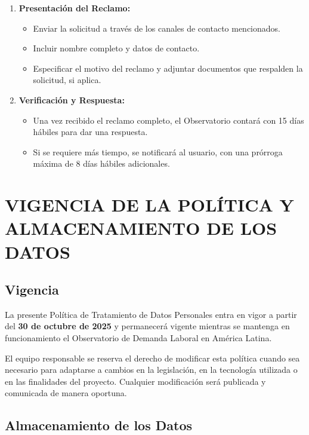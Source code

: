 \documentclass[11pt,oneside,letterpaper]{article}
\begin{document}
\begin{enumerate}
    \item \textbf{Presentación del Reclamo:}
    \begin{itemize}
        \item Enviar la solicitud a través de los canales de contacto mencionados.
        \item Incluir nombre completo y datos de contacto.
        \item Especificar el motivo del reclamo y adjuntar documentos que respalden la solicitud, si aplica.
    \end{itemize}

    \item \textbf{Verificación y Respuesta:}
    \begin{itemize}
        \item Una vez recibido el reclamo completo, el Observatorio contará con 15 días hábiles para dar una respuesta.
        \item Si se requiere más tiempo, se notificará al usuario, con una prórroga máxima de 8 días hábiles adicionales.
    \end{itemize}
\end{enumerate}

\newpage

\section{VIGENCIA DE LA POLÍTICA Y ALMACENAMIENTO DE LOS DATOS}

\subsection{Vigencia}

La presente Política de Tratamiento de Datos Personales entra en vigor a partir del \textbf{30 de octubre de 2025} y permanecerá vigente mientras se mantenga en funcionamiento el Observatorio de Demanda Laboral en América Latina.

El equipo responsable se reserva el derecho de modificar esta política cuando sea necesario para adaptarse a cambios en la legislación, en la tecnología utilizada o en las finalidades del proyecto. Cualquier modificación será publicada y comunicada de manera oportuna.

\subsection{Almacenamiento de los Datos}
\end{document}
